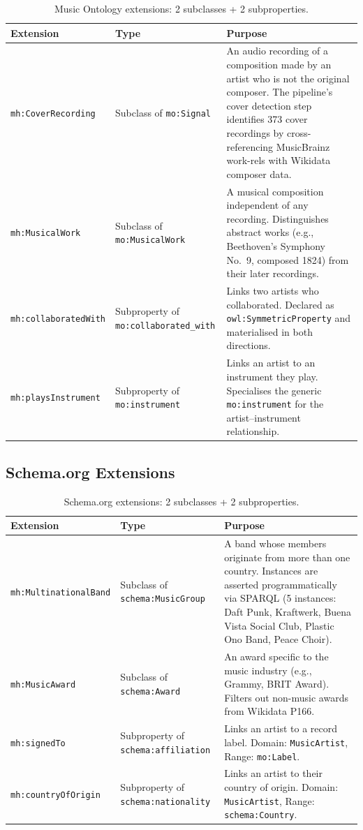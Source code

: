 \begin{table}[h]
\centering
\small
\begin{tabular}{llp{7cm}}
\toprule
\textbf{Extension} & \textbf{Type} & \textbf{Purpose} \\
\midrule
\texttt{mh:CoverRecording} & Subclass of \texttt{mo:Signal} & An audio recording of a composition made by an artist who is not the original composer. The pipeline's cover detection step identifies 373 cover recordings by cross-referencing MusicBrainz work-rels with Wikidata composer data. \\[4pt]
\texttt{mh:MusicalWork} & Subclass of \texttt{mo:MusicalWork} & A musical composition independent of any recording. Distinguishes abstract works (e.g., Beethoven's Symphony No.~9, composed 1824) from their later recordings. \\[4pt]
\texttt{mh:collaboratedWith} & Subproperty of \texttt{mo:collaborated\_with} & Links two artists who collaborated. Declared as \texttt{owl:SymmetricProperty} and materialised in both directions. \\[4pt]
\texttt{mh:playsInstrument} & Subproperty of \texttt{mo:instrument} & Links an artist to an instrument they play. Specialises the generic \texttt{mo:instrument} for the artist--instrument relationship. \\
\bottomrule
\end{tabular}
\caption{Music Ontology extensions: 2 subclasses + 2 subproperties.}
\end{table}

\subsection{Schema.org Extensions}

\begin{table}[h]
\centering
\small
\begin{tabular}{llp{7cm}}
\toprule
\textbf{Extension} & \textbf{Type} & \textbf{Purpose} \\
\midrule
\texttt{mh:MultinationalBand} & Subclass of \texttt{schema:MusicGroup} & A band whose members originate from more than one country. Instances are asserted programmatically via SPARQL (5 instances: Daft Punk, Kraftwerk, Buena Vista Social Club, Plastic Ono Band, Peace Choir). \\[4pt]
\texttt{mh:MusicAward} & Subclass of \texttt{schema:Award} & An award specific to the music industry (e.g., Grammy, BRIT Award). Filters out non-music awards from Wikidata P166. \\[4pt]
\texttt{mh:signedTo} & Subproperty of \texttt{schema:affiliation} & Links an artist to a record label. Domain: \texttt{MusicArtist}, Range: \texttt{mo:Label}. \\[4pt]
\texttt{mh:countryOfOrigin} & Subproperty of \texttt{schema:nationality} & Links an artist to their country of origin. Domain: \texttt{MusicArtist}, Range: \texttt{schema:Country}. \\
\bottomrule
\end{tabular}
\caption{Schema.org extensions: 2 subclasses + 2 subproperties.}
\end{table}

